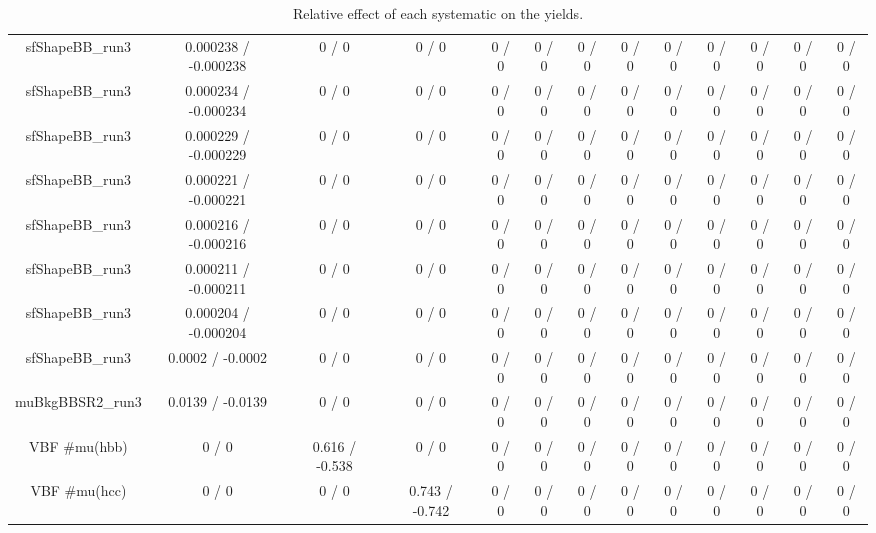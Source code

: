 \documentclass[10pt]{article}
\begin{document}
\begin{table}[htbp]
\begin{center}
\begin{tabular}{|c|c|c|c|c|c|c|c|c|c|c|c|c|}
  sfShapeBB_run3 & 0.000238 / -0.000238 & 0 / 0 & 0 / 0 & 0 / 0 & 0 / 0 & 0 / 0 & 0 / 0 & 0 / 0 & 0 / 0 & 0 / 0 & 0 / 0 & 0 / 0 \\ 
  sfShapeBB_run3 & 0.000234 / -0.000234 & 0 / 0 & 0 / 0 & 0 / 0 & 0 / 0 & 0 / 0 & 0 / 0 & 0 / 0 & 0 / 0 & 0 / 0 & 0 / 0 & 0 / 0 \\ 
  sfShapeBB_run3 & 0.000229 / -0.000229 & 0 / 0 & 0 / 0 & 0 / 0 & 0 / 0 & 0 / 0 & 0 / 0 & 0 / 0 & 0 / 0 & 0 / 0 & 0 / 0 & 0 / 0 \\ 
  sfShapeBB_run3 & 0.000221 / -0.000221 & 0 / 0 & 0 / 0 & 0 / 0 & 0 / 0 & 0 / 0 & 0 / 0 & 0 / 0 & 0 / 0 & 0 / 0 & 0 / 0 & 0 / 0 \\ 
  sfShapeBB_run3 & 0.000216 / -0.000216 & 0 / 0 & 0 / 0 & 0 / 0 & 0 / 0 & 0 / 0 & 0 / 0 & 0 / 0 & 0 / 0 & 0 / 0 & 0 / 0 & 0 / 0 \\ 
  sfShapeBB_run3 & 0.000211 / -0.000211 & 0 / 0 & 0 / 0 & 0 / 0 & 0 / 0 & 0 / 0 & 0 / 0 & 0 / 0 & 0 / 0 & 0 / 0 & 0 / 0 & 0 / 0 \\ 
  sfShapeBB_run3 & 0.000204 / -0.000204 & 0 / 0 & 0 / 0 & 0 / 0 & 0 / 0 & 0 / 0 & 0 / 0 & 0 / 0 & 0 / 0 & 0 / 0 & 0 / 0 & 0 / 0 \\ 
  sfShapeBB_run3 & 0.0002 / -0.0002 & 0 / 0 & 0 / 0 & 0 / 0 & 0 / 0 & 0 / 0 & 0 / 0 & 0 / 0 & 0 / 0 & 0 / 0 & 0 / 0 & 0 / 0 \\ 
  muBkgBBSR2_run3 & 0.0139 / -0.0139 & 0 / 0 & 0 / 0 & 0 / 0 & 0 / 0 & 0 / 0 & 0 / 0 & 0 / 0 & 0 / 0 & 0 / 0 & 0 / 0 & 0 / 0 \\ 
  VBF #mu(hbb) & 0 / 0 & 0.616 / -0.538 & 0 / 0 & 0 / 0 & 0 / 0 & 0 / 0 & 0 / 0 & 0 / 0 & 0 / 0 & 0 / 0 & 0 / 0 & 0 / 0 \\ 
  VBF #mu(hcc) & 0 / 0 & 0 / 0 & 0.743 / -0.742 & 0 / 0 & 0 / 0 & 0 / 0 & 0 / 0 & 0 / 0 & 0 / 0 & 0 / 0 & 0 / 0 & 0 / 0 \\ 
\hline 
\end{tabular} 
\caption{Relative effect of each systematic on the yields.} 
\end{center} 
\end{table} 
\end{document}
